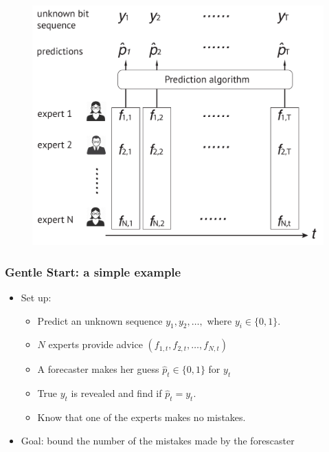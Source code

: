 \documentclass{beamer}
\begin{document}
\begin{frame}
\begin{figure}
\includegraphics[scale = 0.35]{figures/expert_problem.pdf}
\end{figure}

\end{frame}





\begin{frame}
\frametitle{Gentle Start: a simple example}
\begin{itemize}
\item Set up:
\begin{itemize}
\item Predict an unknown sequence $y_1, y_2, \ldots,$ where $y_i\in\{0,1\}.$
\item $N$ experts provide advice $(f_{1,t},f_{2,t},\ldots, f_{N,t})$
\item A forecaster makes her guess $\hat{p}_t\in\{0,1\}$ for $y_t$ 
\item True $y_t$ is revealed and find if $\hat{p}_t = y_t$. 
\item {\color{red}Know that one of the experts makes no mistakes.}
\end{itemize}
\item Goal: bound the number of the mistakes made by the forescaster
\end{itemize}
\end{frame}
\end{document}
